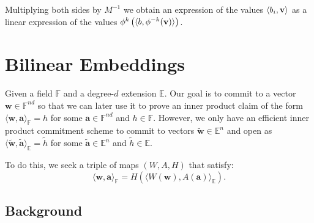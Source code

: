 \documentclass[11pt,letterpaper,usenames,dvipsnames]{article}
\begin{document}
Multiplying both sides by $M^{-1}$ we obtain an expression of the values $\langle b_i, \mathbf{v}\rangle$ as a linear expression of the values $\phi^{k} \left(\langle b, \phi^{-k}(\mathbf{v})\rangle\right)$.






\section{Bilinear Embeddings}

Given a field $\mathbb F$ and a degree-$d$ extension $\mathbb E$. Our goal is to commit to a vector $\mathbf{w} \in \mathbb{F}^{n d}$ so that we can later use it to prove an inner product claim of the form $\langle \mathbf{w}, \mathbf{a}\rangle_\mathbb{F} = h$ for some $\mathbf{a} \in \mathbb{F}^{n d}$ and $h \in \mathbb{F}$. However, we only have an efficient inner product commitment scheme to commit to vectors $\widetilde{\mathbf{w}} \in \mathbb{E}^{n}$ and open as $\langle \widetilde{\mathbf{w}}, \widetilde{\mathbf{a}}\rangle_\mathbb{E} = \widetilde{h}$ for some $\widetilde{\mathbf{a}} \in \mathbb{E}^{n}$ and $\widetilde{h} \in \mathbb{E}$.

To do this, we seek a triple of maps $(W, A, H)$ that satisfy:
\[ 
\langle \mathbf{w},\mathbf{a}\rangle_{\mathbb{F}}
=
H\left(\langle W(\mathbf{w}), A(\mathbf{a}) \rangle_{\mathbb{E}} \right).
\]

\subsection{Background}
\end{document}
